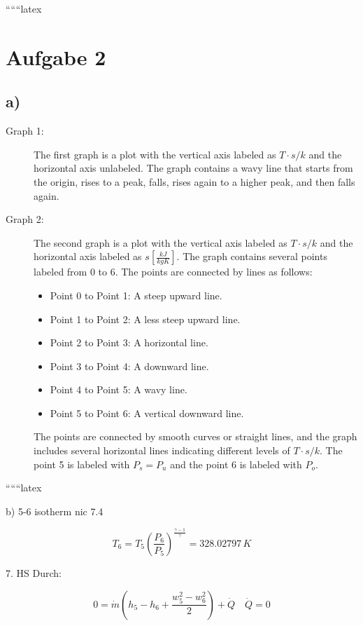 
``````latex


\section*{Aufgabe 2}

\subsection*{a)}

\begin{description}
    \item[Graph 1:] The first graph is a plot with the vertical axis labeled as \( T \cdot s/k \) and the horizontal axis unlabeled. The graph contains a wavy line that starts from the origin, rises to a peak, falls, rises again to a higher peak, and then falls again.
    
    \item[Graph 2:] The second graph is a plot with the vertical axis labeled as \( T \cdot s/k \) and the horizontal axis labeled as \( s \left[ \frac{kJ}{kgK} \right] \). The graph contains several points labeled from 0 to 6. The points are connected by lines as follows:
    \begin{itemize}
        \item Point 0 to Point 1: A steep upward line.
        \item Point 1 to Point 2: A less steep upward line.
        \item Point 2 to Point 3: A horizontal line.
        \item Point 3 to Point 4: A downward line.
        \item Point 4 to Point 5: A wavy line.
        \item Point 5 to Point 6: A vertical downward line.
    \end{itemize}
    The points are connected by smooth curves or straight lines, and the graph includes several horizontal lines indicating different levels of \( T \cdot s/k \). The point 5 is labeled with \( P_s = P_u \) and the point 6 is labeled with \( P_o \).
\end{description}

``````latex


b) 5-6 isotherm nic 7.4

\[
T_6 = T_5 \left( \frac{P_6}{P_5} \right)^{\frac{\gamma-1}{\gamma}} = 328.02797 \, K
\]

7. HS Durch:

\[
0 = \dot{m} \left( h_5 - h_6 + \frac{w_5^2 - w_6^2}{2} \right) + \dot{Q} \quad \dot{Q} = 0
\]


